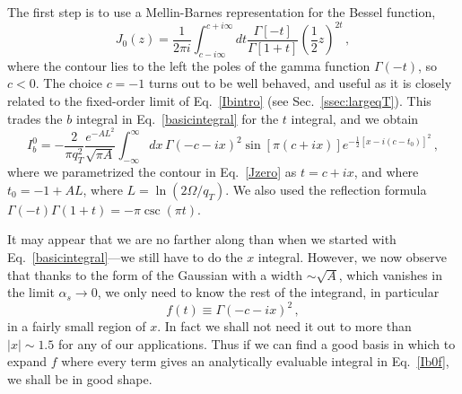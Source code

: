\documentclass[a4,letterpaper,11pt]{article}
\newcommand{\be}{\begin{equation}}
\newcommand{\ee}{\end{equation}}
\newcommand{\abs}[1]{\left\lvert #1\right\rvert}
\newcommand{\as}{\alpha_s}
\newcommand{\eq}[1]{Eq.~\eqref{#1}}
\newcommand{\ssec}[1]{Sec.~\ref{ssec:#1}}
\begin{document}
The first step is to use a Mellin-Barnes representation for the Bessel function,
\be
\label{Jzero}
J_0(z) = \frac{1}{2 \pi i}\int_{c-i \infty}^{c+i \infty} dt \frac{\Gamma[-t]}{\Gamma[1+t]} \left(\frac{1}{2} z \right)^{2t}  \,,
\ee
where the contour lies to the left the poles of the gamma function $\Gamma(-t)$, so $c<0$. The choice $c=-1$ turns out to be well behaved, and useful as it is closely related to the fixed-order limit of \eq{Ibintro} (see \ssec{largeqT}). This trades the $b$ integral in \eq{basicintegral} for the $t$ integral, and we obtain
\be
\label{Ib0f}
I_b^0 = -\frac{2}{\pi q_T^2}\frac{e^{-AL^2}}{\sqrt{\pi A}}\int_{- \infty}^{\infty} dx\, \Gamma(-c-ix)^2 \sin[\pi (c+ix)] e^{-\frac{1}{2}[x - i(c-t_0)]^2}\,,
\ee
where we parametrized the contour in \eq{Jzero} as $t=c+ix$, and where $t_0 = -1+AL$, where $L = \ln (2\Omega/q_T)$. We also used the reflection formula $\Gamma(-t)\Gamma(1+t) = -\pi\csc(\pi t)$.

It may appear that we are no farther along than when we started with \eq{basicintegral}---we still have to do the $x$ integral. However, we now observe that thanks to the form of the Gaussian with a width $\sim \sqrt{A}$, which vanishes in the limit $\as\to 0$, we only need to know the rest of the integrand, in particular 
\be
\label{f}
f(t)\equiv \Gamma(-c-ix)^2\,,
\ee 
in a fairly small region of $x$. In fact we shall not need it out to more than $\abs{x}\sim 1.5$ for any of our applications. Thus if we can find a good basis in which to expand $f$ where every term gives an analytically evaluable integral in \eq{Ib0f}, we shall be in good shape. 
\end{document}
